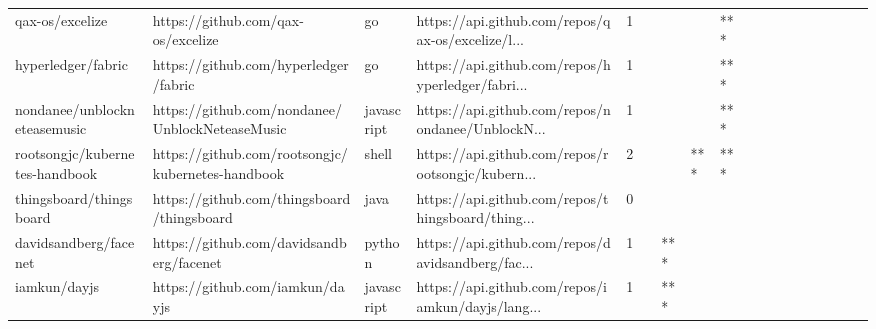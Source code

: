 \begin{tabular}{llllrlllllllllllll}
qax-os/excelize                                    &                 https://github.com/qax-os/excelize &                go &  https://api.github.com/repos/qax-os/excelize/l... &       1 &         &        &           &            *** &                 &        &           &           &          &          &       &              &          \\
hyperledger/fabric                                 &              https://github.com/hyperledger/fabric &                go &  https://api.github.com/repos/hyperledger/fabri... &       1 &         &        &           &            *** &                 &        &           &           &          &          &       &              &          \\
nondanee/unblockneteasemusic                       &    https://github.com/nondanee/UnblockNeteaseMusic &        javascript &  https://api.github.com/repos/nondanee/UnblockN... &       1 &         &        &           &            *** &                 &        &           &           &          &          &       &              &          \\
rootsongjc/kubernetes-handbook                     &  https://github.com/rootsongjc/kubernetes-handbook &             shell &  https://api.github.com/repos/rootsongjc/kubern... &       2 &         &        &       *** &            *** &                 &        &           &           &          &          &       &              &          \\
thingsboard/thingsboard                            &         https://github.com/thingsboard/thingsboard &              java &  https://api.github.com/repos/thingsboard/thing... &       0 &         &        &           &                &                 &        &           &           &          &          &       &              &          \\
davidsandberg/facenet                              &           https://github.com/davidsandberg/facenet &            python &  https://api.github.com/repos/davidsandberg/fac... &       1 &         &    *** &           &                &                 &        &           &           &          &          &       &              &          \\
iamkun/dayjs                                       &                    https://github.com/iamkun/dayjs &        javascript &  https://api.github.com/repos/iamkun/dayjs/lang... &       1 &         &    *** &           &                &                 &        &           &           &          &          &       &              &          \\

\end{tabular}

